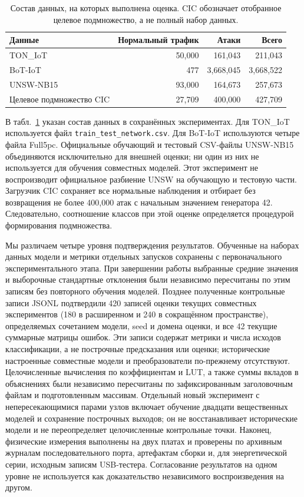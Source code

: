 \begin{table}[t]
\caption{Состав данных, на которых выполнена оценка. CIC обозначает отобранное целевое подмножество, а не полный набор данных.}
\label{tab:populations}
\centering\footnotesize
\begin{tabular}{lrrr}
\toprule
Данные & Нормальный трафик & Атаки & Всего\\
\midrule
TON\_IoT & 50,000 & 161,043 & 211,043\\
BoT-IoT & 477 & 3,668,045 & 3,668,522\\
UNSW-NB15 & 93,000 & 164,673 & 257,673\\
Целевое подмножество CIC & 27,709 & 400,000 & 427,709\\
\bottomrule
\end{tabular}
\end{table}

В табл.~\ref{tab:populations} указан состав данных в сохранённых экспериментах. Для TON\_IoT используется файл \texttt{train\_test\_network.csv}. Для BoT-IoT используются четыре файла Full5pc. Официальные обучающий и тестовый CSV-файлы UNSW-NB15 объединяются исключительно для внешней оценки; ни один из них не используется для обучения совместных моделей. Этот эксперимент не воспроизводит официальное разбиение UNSW на обучающую и тестовую части. Загрузчик CIC сохраняет все нормальные наблюдения и отбирает без возвращения не более 400,000 атак с начальным значением генератора 42. Следовательно, соотношение классов при этой оценке определяется процедурой формирования подмножества.

Мы различаем четыре уровня подтверждения результатов. Обученные на наборах данных модели и метрики отдельных запусков сохранены с первоначального экспериментального этапа. При завершении работы выбранные средние значения и выборочные стандартные отклонения были независимо пересчитаны по этим записям без повторного обучения моделей. Позднее полученные контрольные записи JSONL подтвердили 420 записей оценки текущих совместных экспериментов (180 в расширенном и 240 в сокращённом пространстве), определяемых сочетанием модели, seed и домена оценки, и все 42 текущие суммарные матрицы ошибок. Эти записи содержат метрики и числа исходов классификации, а не построчные предсказания или оценки; исторические настроенные совместные модели и преобразователи по-прежнему отсутствуют. Целочисленные вычисления по коэффициентам и LUT, а также суммы вкладов в объяснениях были независимо пересчитаны по зафиксированным заголовочным файлам и подготовленным массивам. Отдельный новый эксперимент с непересекающимися парами узлов включает обучение двадцати вещественных моделей и сохранение построчных выходов; он не восстанавливает исторические модели и не переопределяет целочисленные контрольные точки. Наконец, физические измерения выполнены на двух платах и проверены по архивным журналам последовательного порта, артефактам сборки и, для энергетической серии, исходным записям USB-тестера. Согласование результатов на одном уровне не используется как доказательство независимого воспроизведения на другом.

